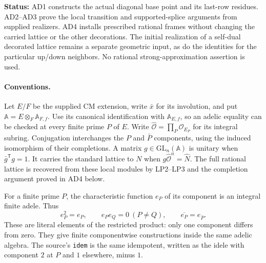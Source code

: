 \documentclass[11pt,a4paper]{article}
\numberwithin{equation}{section}
\theoremstyle{remark}\newtheorem{remark}[theorem]{Remark}
\newcommand{\status}[1]{\textbf{Status:} #1}
\begin{document}
\status{AD1 constructs the actual diagonal base point and its last-row
residues. AD2--AD3 prove the local transition and supported-splice
arguments from supplied realizers. AD4 installs prescribed rational
frames without changing the carried lattice or the other decorations.
The initial realization of a self-dual decorated lattice remains a
separate geometric input, as do the identities for the particular
up/down neighbors. No rational strong-approximation assertion is used.}

\paragraph{Conventions.}
Let $E/F$ be the supplied CM extension, write $\bar x$ for its
involution, and put $\mathbb A=E\otimes_F\mathbb A_{F,f}$.
Use its canonical identification with $\mathbb A_{E,f}$, so an
adelic equality can be checked at every finite prime $P$ of $E$.
Write $\widehat{\mathcal O}=\prod_P\mathcal O_{E_P}$ for its
integral subring. Conjugation interchanges the $P$ and $\bar P$
components, using the induced isomorphism of their completions.
A matrix $g\in\mathrm{GL}_n(\mathbb A)$ is unitary when
$\bar g^{\mathsf T}g=1$. It carries the standard lattice to $N$
when $g\widehat{\mathcal O}^{n}=\widehat N$.
The full rational lattice is recovered from these local modules
by LP2--LP3 and the completion argument proved in AD4 below.

For a finite prime $P$, the characteristic function $e_P$ of its
component is an integral finite adele. Thus
\[
 e_P^2=e_P,\qquad e_Pe_Q=0\ (P\ne Q),\qquad
 \overline{e_P}=e_{\bar P}.                         \tag{AD.1}
\]
These are literal elements of the restricted product: only one
component differs from zero. They give finite componentwise
constructions inside the same adelic algebra. The source's
\texttt{idem} is the same idempotent, written as the idele with
component $2$ at $P$ and $1$ elsewhere, minus $1$.
\end{document}
